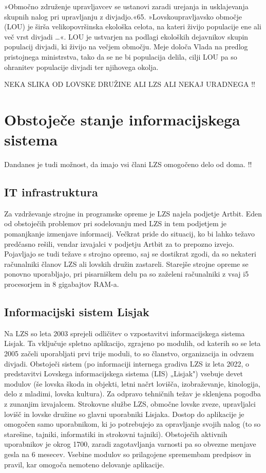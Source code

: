 \documentclass[a4paper,12pt,openright]{book}
\begin{document}
»Območno združenje upravljavcev se ustanovi zaradi urejanja in usklajevanja skupnih nalog pri upravljanju z divjadjo.«{65}.
»Lovskoupravljavsko območje (LOU) je širša velikopovršinska ekološka celota, na kateri živijo populacije ene ali več vrst divjadi …«\parencite[66]{Lov}. 
LOU je ustvarjen na podlagi ekoloških dejavnikov skupin populacij divjadi, ki živijo na večjem območju. 
Meje določa Vlada na predlog pristojnega ministrstva, tako da se ne bi populacija delila, cilji LOU pa so ohranitev populacije divjadi ter njihovega okolja.

NEKA SLIKA OD LOVSKE DRUŽINE ALI LZS ALI NEKAJ URADNEGA !!





\chapter{Obstoječe stanje informacijskega sistema}
\label{stanje}

Dandanes je tudi možnost, da imajo vsi člani LZS omogočeno delo od doma. !!
\section{IT infrastruktura}

Za vzdrževanje strojne in programske opreme je LZS najela podjetje Artbit.
Eden od obstoječih problemov pri sodelovanju med LZS in tem podjetjem je pomanjkanje izmenjave informacij. 
Večkrat pride do situacij, ko bi lahko težavo predčasno rešili, vendar izvajalci v podjetju Artbit za to prepozno izvejo.
Pojavljajo se tudi težave s strojno opremo, saj se dostikrat zgodi, da so nekateri računalniki članov LZS ali lovskih družin zastareli.
Starejše strojne opreme se ponovno uporabljajo, pri pisarniškem delu pa so zaželeni računalniki z vsaj i5 procesorjem in 8 gigabajtov RAM-a.


\section{Informacijski sistem Lisjak}

Na LZS so leta 2003 sprejeli odličitev o vzpostavitvi informacijskega sistema Lisjak. 
Ta vključuje spletno aplikacijo, zgrajeno po modulih, od katerih so se leta 2005 začeli uporabljati prvi trije moduli, to so članstvo, organizacija in odvzem divjadi.
Obstoječi sistem (po informaciji internega gradiva LZS iz leta 2022, o predstavitvi Lovskega informacijskega sistema (LIS) „Lisjak") vsebuje devet modulov (še lovska škoda in objekti, letni načrt lovišča, izobraževanje, kinologija, delo z mladimi, lovska kultura).
Za odpravo tehničnih težav je sklenjena pogodba z zunanjim izvajalcem.
Strokovne službe LZS, območne lovske zveze, upravljalci lovišč in lovske družine so glavni uporabniki Lisjaka.
Dostop do aplikacije je omogočen samo uporabnikom, ki jo potrebujejo za opravljanje svojih nalog (to so starešine, tajniki, informatiki in strokovni tajniki).
Obstoječih aktivnih uporabnikov je okrog 1700, zaradi zagotavljanja varnosti pa so obvezne menjave gesla na 6 mesecev.
Vsebine modulov so prilagojene spremembam predpisov in pravil, kar omogoča nemoteno delovanje aplikacije.
\end{document}
